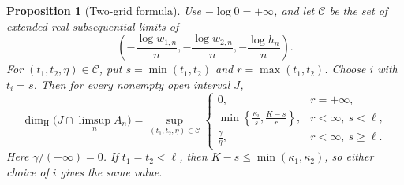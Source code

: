 \documentclass[11pt,reqno,a4paper]{amsart}
\newtheorem{proposition}[theorem]{Proposition}
\theoremstyle{remark}
\numberwithin{equation}{section}
\begin{document}
\begin{proposition}[Two-grid formula]\label{prop:two-grid-rates}
Use \(-\log 0=+\infty\), and let \(\mathcal C\) be the set of
extended-real subsequential limits of
\[
  \left(-\frac{\log w_{1,n}}n,-\frac{\log w_{2,n}}n,
                         -\frac{\log h_n}n\right).
\]
For \((t_1,t_2,\eta)\in\mathcal C\), put \(s=\min(t_1,t_2)\) and
\(r=\max(t_1,t_2)\). Choose \(i\) with \(t_i=s\). Then for every
nonempty open interval \(J\),
\begin{equation}\label{eq:two-grid-rates}
  \dim_{\mathrm H}\bigl(J\cap\limsup_n A_n\bigr)
  =\sup_{(t_1,t_2,\eta)\in\mathcal C}
  \begin{cases}
    0, & r=+\infty,\\[2pt]
    \displaystyle\min\!\left\{\frac{\kappa_i}{s},\frac{K-s}{r}\right\},
        & r<\infty,\ s<\ell,\\[6pt]
    \displaystyle\frac{\gamma}{\eta}, & r<\infty,\ s\ge\ell .
  \end{cases}
\end{equation}
Here \(\gamma/(+\infty)=0\). If \(t_1=t_2<\ell\), then
\(K-s\le\min(\kappa_1,\kappa_2)\), so either choice of \(i\) gives
the same value.
\end{proposition}
\end{document}
